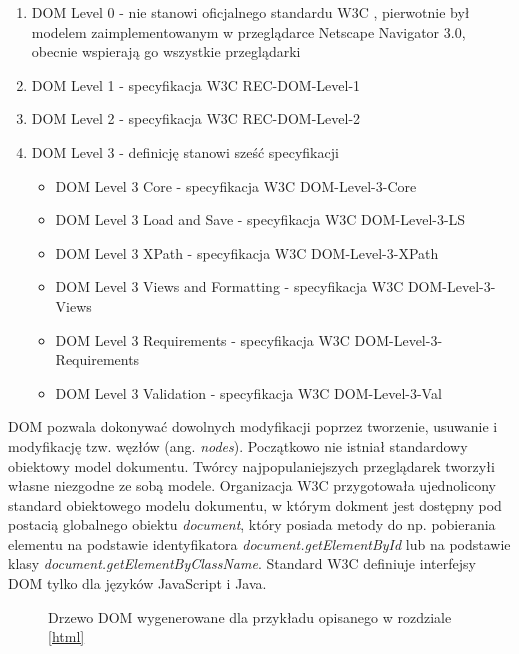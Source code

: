 \documentclass[polish, twoside, 12pt]{mwart}
\begin{document}
\begin{enumerate}
  \item DOM Level 0 - nie stanowi oficjalnego standardu W3C \cite{w3c}, pierwotnie był modelem zaimplementowanym w przeglądarce Netscape Navigator 3.0, obecnie wspierają go wszystkie przeglądarki
  \item DOM Level 1 - specyfikacja W3C REC-DOM-Level-1 \cite{w3c-rec-dom-level-1} 
  \item DOM Level 2 - specyfikacja W3C REC-DOM-Level-2 \cite{w3c-rec-dom-level-2} 
  \item DOM Level 3 - definicję stanowi sześć specyfikacji
  \begin{itemize}
    \item DOM Level 3 Core - specyfikacja W3C DOM-Level-3-Core \cite{w3c-rec-dom-level-3-core}
    \item DOM Level 3 Load and Save - specyfikacja W3C DOM-Level-3-LS \cite{w3c-rec-dom-level-3-ls}
    \item DOM Level 3 XPath - specyfikacja W3C DOM-Level-3-XPath \cite{w3c-rec-dom-level-3-xpath}
    \item DOM Level 3 Views and Formatting - specyfikacja W3C DOM-Level-3-Views \cite{w3c-rec-dom-level-3-views}
    \item DOM Level 3 Requirements - specyfikacja W3C DOM-Level-3-Requirements \cite{w3c-rec-dom-level-3-requirements}
    \item DOM Level 3 Validation - specyfikacja W3C DOM-Level-3-Val \cite{w3c-rec-dom-level-3-val}
  \end{itemize}
\end{enumerate}

DOM pozwala dokonywać dowolnych modyfikacji poprzez tworzenie, usuwanie i modyfikację tzw. węzłów (ang. \emph{nodes}). Początkowo nie istniał standardowy obiektowy model dokumentu. Twórcy najpopulaniejszych przeglądarek tworzyłi własne niezgodne ze sobą modele. Organizacja W3C \cite{w3c} przygotowała ujednolicony standard obiektowego modelu dokumentu, w którym dokment jest dostępny pod postacią globalnego obiektu \emph{document}, który posiada metody do np. pobierania elementu na podstawie identyfikatora \emph{document.getElementById} lub na podstawie klasy \emph{document.getElementByClassName}. Standard W3C definiuje interfejsy DOM tylko dla języków JavaScript i Java.

\begin{figure}
  \centering
  \caption{Drzewo DOM wygenerowane dla przykładu opisanego w rozdziale \ref{html}}
\end{figure}
\end{document}
